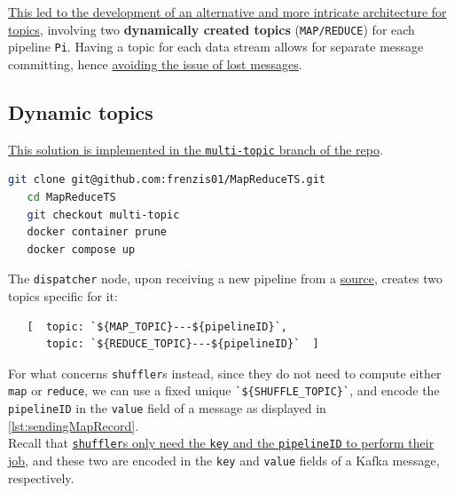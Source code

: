 
\ul{This led to the development of an alternative and more intricate architecture for topics}, involving two \textbf{dynamically created topics} (\lstinline|MAP/REDUCE|) for each pipeline \lstinline|Pi|.
Having a topic for each data stream allows for separate message committing, hence \ul{avoiding the issue of lost messages}.

\subsection{Dynamic topics}
\ul{This solution is implemented in the \texttt{multi-topic} branch of the repo}.

\begin{lstlisting}[language=bash, caption={Testing the dynamic topics implementation}]
   git clone git@github.com:frenzis01/MapReduceTS.git
   cd MapReduceTS
   git checkout multi-topic
   docker container prune
   docker compose up
\end{lstlisting}

The \texttt{dispatcher} node, upon receiving a new pipeline from a \ul{source}, creates two topics specific for it:
\begin{lstlisting}
   [  topic: `${MAP_TOPIC}---${pipelineID}`,
      topic: `${REDUCE_TOPIC}---${pipelineID}`  ]
\end{lstlisting}

For what concerns \texttt{shuffler}s instead, since they do not need to compute either \lstinline|map| or \lstinline|reduce|, we can use a fixed unique \lstinline|`${SHUFFLE_TOPIC}`|, and encode the \lstinline|pipelineID| in the \lstinline{value} field of a message as displayed in \ref{lst:sendingMapRecord}.\\
Recall that \ul{\texttt{shuffler}s only need the \texttt{key} and the \texttt{pipelineID} to perform their job}, and these two are encoded in the \lstinline|key| and \lstinline|value| fields of a Kafka message, respectively. 


